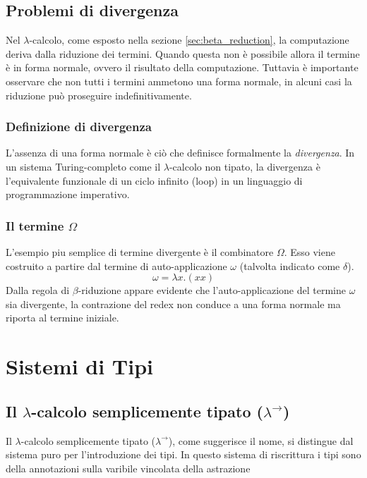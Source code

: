 \subsection{Problemi di divergenza}
Nel $\lambda$-calcolo, come esposto nella sezione \ref{sec:beta_reduction}, la computazione deriva dalla riduzione dei termini. Quando questa non è possibile allora
il termine è in forma normale, ovvero il risultato della computazione. Tuttavia è importante osservare che non tutti i termini ammetono una forma normale, in alcuni 
casi la riduzione può proseguire indefinitivamente. 

\subsubsection{Definizione di divergenza}
L'assenza di una forma normale è ciò che definisce formalmente la \emph{divergenza}. 
In un sistema Turing-completo come il $\lambda$-calcolo non tipato, la divergenza è 
l'equivalente funzionale di un ciclo infinito (loop) in un linguaggio di programmazione imperativo.

\subsubsection{Il termine $\Omega$}
L'esempio piu semplice di termine divergente è il combinatore $\Omega$. Esso viene costruito a partire dal termine di auto-applicazione $\omega$ 
(talvolta indicato come $\delta$).
\begin{equation}
    \omega = \lambda x. (x x)
\end{equation}
Dalla regola di $\beta$-riduzione appare evidente che l'auto-applicazione del termine $\omega$ sia divergente, la contrazione del redex non conduce a una forma normale ma 
riporta al termine iniziale.

\section{Sistemi di Tipi}

\subsection{Il \texorpdfstring{$\lambda$}{Lambda}-calcolo semplicemente tipato (\texorpdfstring{$\lambda^{\to}$}{Lambda-to})}
Il $\lambda$-calcolo semplicemente tipato ($\lambda^{\to}$), come suggerisce il nome, si distingue dal sistema puro per l'introduzione dei tipi.
In questo sistema di riscrittura i tipi sono della annotazioni sulla varibile vincolata della astrazione

